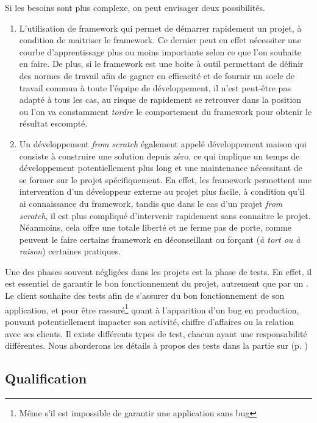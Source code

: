 Si les besoins sont plus complexe, on peut envisager deux possibilités.

\begin{enumerate}
	\item L'utilisation de \gls{framework} qui permet de démarrer rapidement un projet, à condition de maitriser le \gls{framework}. Ce dernier peut en effet nécessiter une courbe d'apprentissage plus ou moins importante selon ce que l'on souhaite en faire. De plus, si le \gls{framework} est une boite à outil permettant de définir des normes de travail afin de gagner en efficacité et de fournir un socle de travail commun à toute l'équipe de développement, il n'est peut-être pas adapté à tous les cas, au risque de rapidement se retrouver dans la position ou l'on va constamment \emph{tordre} le comportement du \gls{framework} pour obtenir le résultat escompté.
	\item Un développement \emph{from scratch} également appelé développement maison qui consiste à construire une solution depuis zéro, ce qui implique un temps de développement potentiellement plus long et une maintenance nécessitant de se former sur le projet spécifiquement. En effet, les \gls{framework} permettent une intervention d'un développeur externe au projet plus facile, à condition qu'il ai connaissance du \gls{framework}, tandis que dans le cas d'un projet \emph{from scratch}, il est plus compliqué d'intervenir rapidement sans connaitre le projet. Néanmoins, cela offre une totale liberté et ne ferme pas de porte, comme peuvent le faire certains \gls{framework} en déconseillant ou forçant (\emph{à tort ou à raison}) certaines pratiques.
\end{enumerate}

Une des phases souvent négligées dans les projets est la phase de tests. En effet, il est essentiel de garantir le bon fonctionnement du projet, autrement que par un . Le client souhaite des tests afin de s'assurer du bon fonctionnement de son application, et pour être rassuré\footnote{Même s'il est impossible de garantir une application sans bug} quant à l'apparition d'un bug en production, pouvant potentiellement impacter son activité, chiffre d'affaires ou la relation avec ses clients. Il existe différents types de test, chacun ayant une responsabilité différentes. Nous aborderons les détails à propos des tests dans la partie sur  (p. \pageref{importance-test})

\subsection{Qualification}

